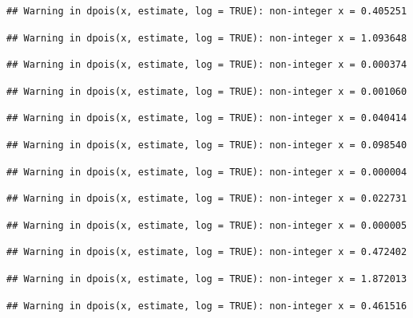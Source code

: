 \documentclass[]{article}
\begin{document}
\begin{verbatim}
## Warning in dpois(x, estimate, log = TRUE): non-integer x = 0.405251
\end{verbatim}

\begin{verbatim}
## Warning in dpois(x, estimate, log = TRUE): non-integer x = 1.093648
\end{verbatim}

\begin{verbatim}
## Warning in dpois(x, estimate, log = TRUE): non-integer x = 0.000374
\end{verbatim}

\begin{verbatim}
## Warning in dpois(x, estimate, log = TRUE): non-integer x = 0.001060
\end{verbatim}

\begin{verbatim}
## Warning in dpois(x, estimate, log = TRUE): non-integer x = 0.040414
\end{verbatim}

\begin{verbatim}
## Warning in dpois(x, estimate, log = TRUE): non-integer x = 0.098540
\end{verbatim}

\begin{verbatim}
## Warning in dpois(x, estimate, log = TRUE): non-integer x = 0.000004
\end{verbatim}

\begin{verbatim}
## Warning in dpois(x, estimate, log = TRUE): non-integer x = 0.022731
\end{verbatim}

\begin{verbatim}
## Warning in dpois(x, estimate, log = TRUE): non-integer x = 0.000005
\end{verbatim}

\begin{verbatim}
## Warning in dpois(x, estimate, log = TRUE): non-integer x = 0.472402
\end{verbatim}

\begin{verbatim}
## Warning in dpois(x, estimate, log = TRUE): non-integer x = 1.872013
\end{verbatim}

\begin{verbatim}
## Warning in dpois(x, estimate, log = TRUE): non-integer x = 0.461516
\end{verbatim}
\end{document}
